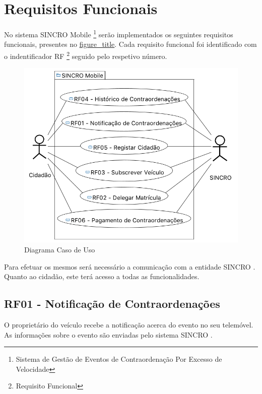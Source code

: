 \documentclass{article}
\begin{document}
\hypertarget{_requisitos_funcionais}{%
\section{Requisitos Funcionais}\label{_requisitos_funcionais}}

No sistema SINCRO Mobile \footnote{Sistema de Gestão de Eventos de
  Contraordenação Por Excesso de Velocidade} serão implementados os
seguintes requisitos funcionais, presentes no
\protect\hyperlink{use_case}{figure\_title}. Cada requisito funcional
foi identificado com o indentificador RF \footnote{Requisito Funcional}
seguido pelo respetivo número.

\begin{figure}
\centering
\includegraphics[scale=0.5]{./adoc_images/use_case.png}
\caption{Diagrama Caso de Uso}
\end{figure}

Para efetuar os mesmos será necessário a comunicação com a entidade
SINCRO . Quanto ao cidadão, este terá acesso a todas as funcionalidades.

\hypertarget{_rf01_notifica_o_de_contraordena_es}{%
\subsection{RF01 - Notificação de
Contraordenações}\label{_rf01_notifica_o_de_contraordena_es}}

O proprietário do veículo recebe a notificação acerca do evento no seu
telemóvel. As informações sobre o evento são enviadas pelo sistema
SINCRO .
\end{document}
